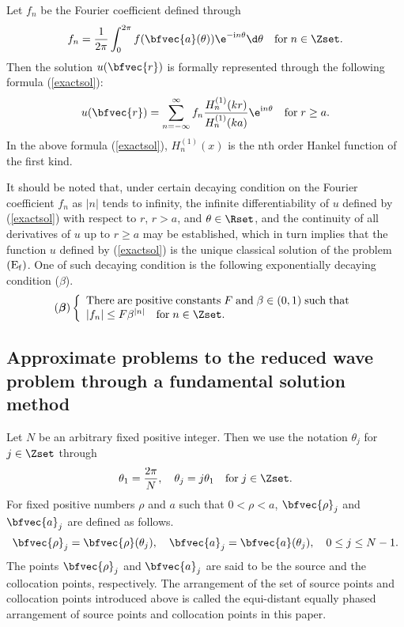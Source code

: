 Let $f_n$ be the Fourier coefficient defined through
\begin{displaymath}
f_n=\frac{1}{2\pi}\int^{2\pi}_{0}f(\bfvec{a}(\theta))\e^{-\mathrm{i} n \theta}\d\theta \quad {\rm for}\;n\in\Zset.
\end{displaymath}
Then the solution $u(\bfvec{r})$ is formally represented through the following formula (\ref{exactsol}):
\begin{equation}
\displaystyle u(\bfvec{r})=\sum^{\infty}_{n=-\infty} f_n \frac{H^{(1)}_n(k r)}{H^{(1)}_n(k a)}\e^{\mathrm{i} n \theta} \quad {\rm for}\;r \ge a.
\label{exactsol}
\end{equation}
In the above formula (\ref{exactsol}), $H^{(1)}_n(x)$ is the nth order Hankel function of the first kind.
\begin{note}
It should be noted that, under certain decaying condition on the Fourier coefficient $f_n$ as $|n|$ tends to infinity, the infinite differentiability of $u$ defined by (\ref{exactsol}) with respect to $r$, $r>a$, and $\theta\in\Rset$, and the continuity of all derivatives of $u$ up to $r\ge a$ may be established, which in turn implies that the function $u$ defined by (\ref{exactsol}) is the unique classical solution of the problem ${\rm (E_f)}$. One of such decaying condition is the following exponentially decaying condition ({\boldmath $\beta$}).
\begin{eqnarray*}
({\mbox {\boldmath $\beta$}})
\left\{
\begin{array}{l}
{\rm There}\;{\rm are}\;{\rm positive}\;{\rm constants}\;F\;{\rm and}\;\beta\in(0,1)\;{\rm such}\;{\rm that}\\
|f_n| \le F\beta^{|n|}\quad {\rm for}\;n\in\Zset. 
\end{array}
\right.
\end{eqnarray*}
\end{note}

\subsection{Approximate problems to the reduced wave  problem through a fundamental solution method}
\label{FSM}
Let $N$ be an arbitrary fixed positive integer. Then we use the notation $\theta_j$ for $j\in\Zset$ through 
\begin{displaymath}
\theta_1=\frac{2\pi}{N}, \quad \theta_j=j\theta_1 \quad {\rm for}\;j\in\Zset.
\end{displaymath}
For fixed positive numbers $\rho$ and $a$ such that $0 < \rho < a$, $\bfvec{\rho}_j$ and $\bfvec{a}_j$ are defined as follows.
\begin{displaymath}
\bfvec{\rho}_j=\bfvec{\rho}(\theta_j), \quad \bfvec{a}_j=\bfvec{a}(\theta_j), \quad 0\le j \le N-1.
\end{displaymath} 
The points $\bfvec{\rho}_j$ and $\bfvec{a}_j$ are said to be the source and the collocation points, respectively. The arrangement of the set of source points and collocation points introduced above is called the equi-distant equally phased arrangement of source points and collocation points in this paper.

